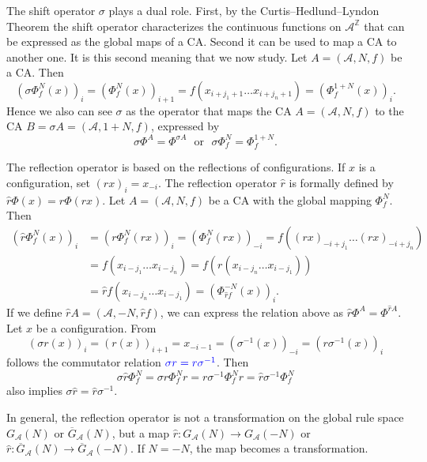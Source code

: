 \documentclass[11pt,a4paper]{article}
\newcommand{\rev}[1]{{\color{blue}#1}}
\newcommand{\rev}[1]{{\color{black}#1}}
\begin{document}
The shift operator $\sigma$ plays a dual role.
First, by the \rev{Curtis--Hedlund--Lyndon} Theorem the shift operator characterizes the continuous functions on $\mathcal{A}^\mathbb{Z}$
that can be expressed as the global maps of a CA.
Second it can be used to map a CA to another one.
It is this second meaning that we now study.
Let $A=(\mathcal{A},N,f)$ be a CA.
Then
\[
(\sigma \Phi^N_f(x))_i = (\Phi^N_f(x))_{i+1}
= f(x_{i+j_1+1} \ldots x_{i+j_{n}+1}) = ( \Phi^{1+N}_f(x))_i.
\]
Hence we also can see $\sigma$ as the operator that maps the CA $A = (\mathcal{A},N,f)$ to
the CA $B = \sigma A = (\mathcal{A}, 1+N,f)$,
expressed by
\[
\sigma \Phi^A = \Phi^{\sigma A} \ \ \ \mbox{or} \ \ \ \sigma \Phi^N_f = \Phi^{1+N}_f.
\]

The reflection operator is based on the reflections of configurations.
If $x$ is a configuration, set $(rx)_i = x_{-i}$.
The reflection operator $\hat{r}$ is formally defined by  \rev{$\hat{r}\Phi(x) = r\Phi(rx)$}.
Let $A = (\mathcal{A},N,f)$ be a CA with the global mapping $\Phi^N_f$.
Then
\begin{align*}
(\hat{r} \Phi^N_f(x))_i & =  (r\Phi^N_f(rx))_i
        =  (\Phi^N_f(rx))_{-i} = f((rx)_{-i+j_1} \ldots (rx)_{-i+j_n}) \\
& =  f(x_{i-j_1} \ldots x_{i-j_n}) = f(r(x_{i-j_n} \ldots x_{i-j_1})) \\
& =  \hat{r} f(x_{i-j_n} \ldots x_{i-j_1}) = (\Phi^{-N}_{\hat{r}f}(x))_i.
\end{align*}
If we define $\hat{r}A = (\mathcal{A}, -N, \hat{r}f)$, we can express the relation above as
$\hat{r} \Phi^A = \Phi^{\hat{r} A}$.
Let $x$ be a configuration.
From
\[
(\sigma r (x))_i = (r(x))_{i+1} = x_{-i-1} = (\sigma^{-1}(x))_{-i} = (r \sigma^{-1}(x))_i
\]
follows the commutator relation $\rev{\sigma r = r\sigma^{-1}}$.
Then
\[
\sigma \hat{r} \Phi^N_f = \sigma r \Phi^N_f r = r \sigma^{-1} \Phi^N_f r = \hat{r} \sigma^{-1} \Phi^N_f
\]
also implies $\sigma \hat{r} = \hat{r} \sigma^{-1}$.


In general, the reflection operator is not a transformation on the global rule space $G_\mathcal{A}(N)$ or
$\overline{G}_\mathcal{A}(N)$,
but a map $\hat{r}: G_\mathcal{A}(N) \to G_\mathcal{A}(-N)$ or $\hat{r}: \overline{G}_\mathcal{A}(N) \to
\overline{G}_\mathcal{A}(-N)$.
If $N = -N$, the map becomes a transformation.
\end{document}
